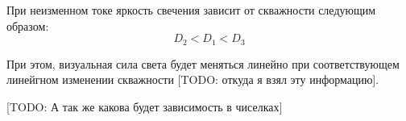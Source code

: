 \begin{par}
При неизменном токе яркость свечения зависит от скважности
следующим образом: \\
    $$ D_2 < D_1 < D_3 $$

При этом, визуальная сила света будет меняться линейно при соответствующем
линейгном изменении скважности [TODO: откуда я взял эту информацию].
\end{par}

[TODO: А так же какова будет зависимость в чиселках]

